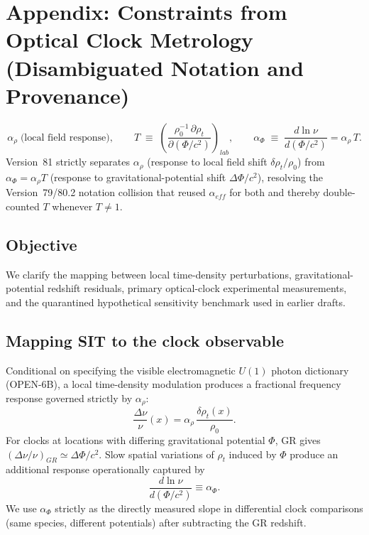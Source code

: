 \documentclass[american,11pt,letterpaper]{article}
\def\mathcal#1{#1}%
\def\mathrm#1{#1}%
\def\texttt#1{#1}%
\begin{document}
\section{Appendix: Constraints from Optical Clock Metrology (Disambiguated Notation and Provenance)}
\label{appendix:ClockConstraints}

\[
\alpha_\rho \;\text{(local field response)},
\qquad
\mathcal{T} \;\equiv\; \left(\frac{\rho_0^{-1}\,\partial\rho_t}{\partial(\Phi/c^2)}\right)_{\mathrm{lab}},
\qquad
\alpha_\Phi \;\equiv\; \frac{d\ln\nu}{d(\Phi/c^{2})} = \alpha_\rho\,\mathcal{T}.
\]
Version~81 strictly separates $\alpha_\rho$ (response to local field shift $\delta\rho_t/\rho_0$) from $\alpha_\Phi = \alpha_\rho\mathcal{T}$ (response to gravitational-potential shift $\Delta\Phi/c^2$), resolving the Version~79/80.2 notation collision that reused $\alpha_{\mathrm{eff}}$ for both and thereby double-counted $\mathcal{T}$ whenever $\mathcal{T} \ne 1$.

\subsection{Objective}
We clarify the mapping between local time-density perturbations, gravitational-potential redshift residuals, primary optical-clock experimental measurements, and the quarantined hypothetical sensitivity benchmark used in earlier drafts.

\subsection{Mapping SIT to the clock observable}
Conditional on specifying the visible electromagnetic $U(1)$ photon dictionary (\texttt{OPEN-6B}), a local time-density modulation produces a fractional frequency response governed strictly by $\alpha_\rho$:
\[
\frac{\Delta \nu}{\nu}(x) = \alpha_\rho\,\frac{\delta \rho_t(x)}{\rho_0}.
\]
For clocks at locations with differing gravitational potential \(\Phi\), GR gives \((\Delta \nu/\nu)_{\mathrm{GR}} \simeq \Delta \Phi / c^{2}\). Slow spatial variations of \(\rho_t\) induced by \(\Phi\) produce an additional response operationally captured by
\[
\frac{d\ln \nu}{d(\Phi / c^{2})} \equiv \alpha_\Phi .
\]
We use \(\alpha_\Phi\) strictly as the directly measured slope in differential clock comparisons (same species, different potentials) after subtracting the GR redshift.
\end{document}
